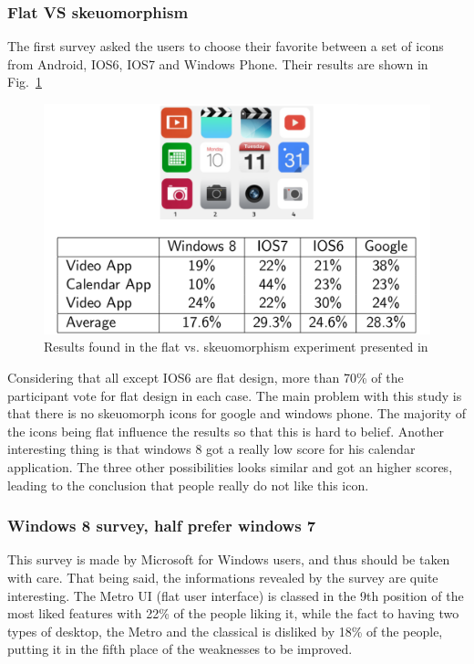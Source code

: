 \documentclass[a4paper,11pt] {article}
\theoremstyle{definition}
\begin{document}
    \subsubsection{Flat VS skeuomorphism}

    The first survey \cite{flatVSskeuomorphisme} asked the users to choose their favorite between a set of icons from Android, IOS6, IOS7 and Windows Phone. Their results are shown in Fig.~\ref{fig:flat-vs-skeu-result}\\

    \begin{figure}[h]
    \centering
    \includegraphics[scale=0.3]{fig-report/flatVSskeuomorphism.png}
    \caption{Results found in the flat vs. skeuomorphism experiment presented in \cite{flatVSskeuomorphisme}}
    \label{fig:flat-vs-skeu-result}
    \end{figure}

    Considering that all except IOS6 are flat design, more than 70\% of the participant vote for flat design in each case. The main problem with this study is that there is no skeuomorph icons for google and windows phone. The majority of the icons being flat influence the results so that this is hard to belief. Another interesting thing is that windows 8 got a really low score for his calendar application. The three other possibilities looks similar and got an higher scores, leading to the conclusion that people really do not like this icon.

    \subsubsection{Windows 8 survey, half prefer windows 7\cite{windows8Survey}}

    This survey is made by Microsoft for Windows users, and thus should be taken with care. That being said, the informations revealed by the survey are quite interesting. The Metro UI (flat user interface) is classed in the 9th position of the most liked features with 22\% of the people liking it, while the fact to having two types of desktop, the Metro and the classical is disliked by 18\% of the people, putting it in the fifth place of the weaknesses to be improved.\\
\end{document}
